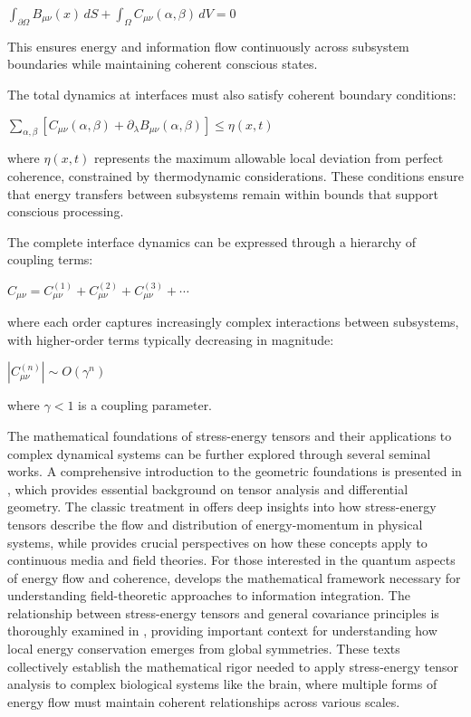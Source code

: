 \begin{refsection}
$\int_{\partial\Omega} B_{\mu\nu}(x)\,dS + \int_\Omega C_{\mu\nu}(\alpha,\beta)\,dV = 0$

This ensures energy and information flow continuously across subsystem boundaries while maintaining coherent conscious states.

The total dynamics at interfaces must also satisfy coherent boundary conditions:

$\sum_{\alpha,\beta} [C_{\mu\nu}(\alpha,\beta) + \partial_\lambda B_{\mu\nu}(\alpha,\beta)] \leq \eta(x,t)$

where $\eta (x,t)$ represents the maximum allowable local deviation from perfect coherence, constrained by thermodynamic considerations. These conditions ensure that energy transfers between subsystems remain within bounds that support conscious processing.

The complete interface dynamics can be expressed through a hierarchy of coupling terms:

$C_{\mu\nu} = C^{(1)}_{\mu\nu} + C^{(2)}_{\mu\nu} + C^{(3)}_{\mu\nu} + \cdots$

where each order captures increasingly complex interactions between subsystems, with higher-order terms typically decreasing in magnitude:

$|C^{(n)}_{\mu\nu}| \sim O(\gamma^n)$

where $\gamma < 1$ is a coupling parameter.

The mathematical foundations of stress-energy tensors and their applications to complex dynamical systems can be further explored through several seminal works. A comprehensive introduction to the geometric foundations is presented in \cite{Frankel2011}, which provides essential background on tensor analysis and differential geometry. The classic treatment in \cite{Misner1973} offers deep insights into how stress-energy tensors describe the flow and distribution of energy-momentum in physical systems, while \cite{Landau1987} provides crucial perspectives on how these concepts apply to continuous media and field theories. For those interested in the quantum aspects of energy flow and coherence, \cite{Peskin1995} develops the mathematical framework necessary for understanding field-theoretic approaches to information integration. The relationship between stress-energy tensors and general covariance principles is thoroughly examined in \cite{Wald1984}, providing important context for understanding how local energy conservation emerges from global symmetries. These texts collectively establish the mathematical rigor needed to apply stress-energy tensor analysis to complex biological systems like the brain, where multiple forms of energy flow must maintain coherent relationships across various scales.


\end{refsection}
